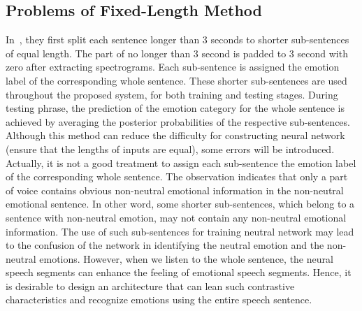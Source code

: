 \documentclass[a4paper]{article}
\begin{document}
\subsection{Problems of Fixed-Length Method}
\label{ssec:problem_fixed_len}

In~\cite{satt2017}, they first split each sentence longer than 3 seconds to shorter sub-sentences of equal length. The part of no longer than 3 second is padded to 3 second with zero after extracting spectrograms. Each sub-sentence is assigned the emotion label of the corresponding whole sentence. These shorter sub-sentences are used throughout the proposed system, for both training and testing stages. During testing phrase, the prediction of the emotion category for the whole sentence is achieved by averaging the posterior probabilities of the respective sub-sentences. Although this method can reduce the difficulty for constructing neural network (ensure that the lengths of inputs are equal), some errors will be introduced. Actually, it is not a good treatment to assign each sub-sentence the emotion label of the corresponding whole sentence. The observation indicates that only a part of voice contains obvious non-neutral emotional information in the non-neutral emotional sentence. In other word, some shorter sub-sentences, which belong to a sentence with non-neutral emotion, may not contain any non-neutral emotional information. The use of such sub-sentences for training neutral network may lead to the confusion of the network in identifying the neutral emotion and the non-neutral emotions. However, when we listen to the whole sentence, the neural speech segments can enhance the feeling of emotional speech segments. Hence, it is desirable to design an architecture that can lean such contrastive characteristics and recognize emotions using the entire speech sentence.


\end{document}
